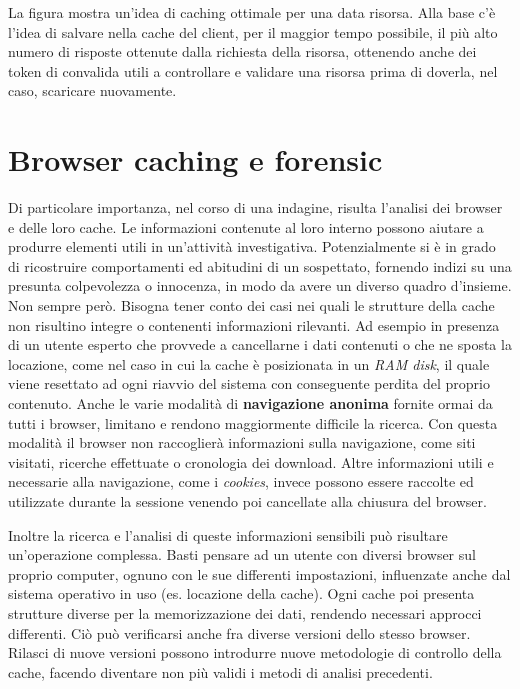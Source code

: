 La figura mostra un'idea di caching ottimale per una data risorsa. Alla base c'è l'idea di salvare nella cache del client, per il maggior tempo possibile, il più alto numero di risposte ottenute dalla richiesta della risorsa, ottenendo anche dei token di convalida utili a controllare e validare una risorsa prima di doverla, nel caso, scaricare nuovamente.

\section {Browser caching e forensic}

Di particolare importanza, nel corso di una indagine, risulta l'analisi dei browser e delle loro cache. Le informazioni contenute al loro interno possono aiutare a produrre elementi utili in un'attività investigativa. 
Potenzialmente si è in grado di ricostruire comportamenti ed abitudini di un sospettato, fornendo indizi su una presunta colpevolezza o innocenza, in modo da avere un diverso quadro d'insieme. Non sempre però. Bisogna tener conto dei casi nei quali le strutture della cache non risultino integre o contenenti informazioni rilevanti. Ad esempio in presenza di un utente esperto che provvede a cancellarne i dati contenuti o che ne sposta la locazione, come nel caso in cui la cache è posizionata in un \textit{RAM disk}, il quale viene resettato ad ogni riavvio del sistema con conseguente perdita del proprio contenuto. Anche le varie modalità di \textbf{navigazione anonima} fornite ormai da tutti i browser, limitano e rendono maggiormente difficile la ricerca. Con questa modalità il browser non raccoglierà informazioni sulla navigazione, come siti visitati, ricerche effettuate o cronologia dei download. Altre informazioni utili e necessarie alla navigazione, come i \textit{cookies}, invece possono essere raccolte ed utilizzate durante la sessione venendo poi cancellate alla chiusura del browser.

Inoltre la ricerca e l'analisi di queste informazioni sensibili può risultare un'operazione complessa. Basti pensare ad un utente con diversi browser sul proprio computer, ognuno con le sue differenti impostazioni, influenzate anche dal sistema operativo in uso (es. locazione della cache). Ogni cache poi presenta strutture diverse per la memorizzazione dei dati, rendendo necessari approcci differenti. Ciò può verificarsi anche fra diverse versioni dello stesso browser. Rilasci di nuove versioni possono introdurre nuove metodologie di controllo della cache, facendo diventare non più validi i metodi di analisi precedenti.




